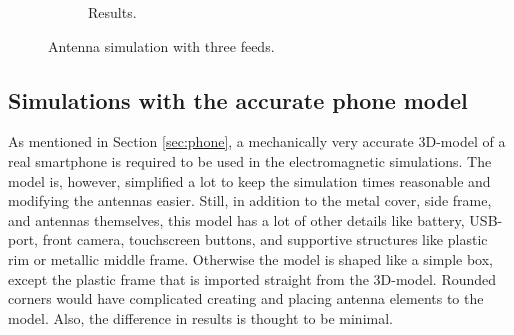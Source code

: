 \begin{figure}[H]
\begin{subfigure}[b]{0.47\textwidth}
        \caption{Results.}
        \label{fig:concept_3feeds_res}
    \end{subfigure}
    \vspace{-5pt}
    \caption{Antenna simulation with three feeds.}
    \label{fig:concept_3feeds}
\end{figure}



\subsection{Simulations with the accurate phone model}
\label{sec:sim_realistic}
As mentioned in Section \ref{sec:phone}, a mechanically very accurate 3D-model of a real smartphone is required to be used in the electromagnetic simulations. The model is, however, simplified a lot to keep the simulation times reasonable and modifying the antennas easier. Still, in addition to the metal cover, side frame, and antennas themselves, this model has a lot of other details like battery, USB-port, front camera, touchscreen buttons, and supportive structures like plastic rim or metallic middle frame. Otherwise the model is shaped like a simple box, except the plastic frame that is imported straight from the 3D-model. Rounded corners would have complicated creating and placing antenna elements to the model. Also, the difference in results is thought to be minimal. 

